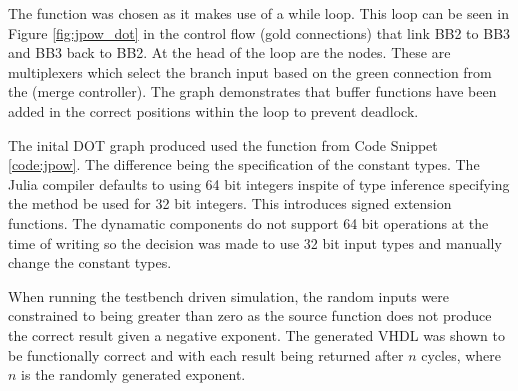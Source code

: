 The  function was chosen as it makes use of a while loop. This loop can be seen in Figure \ref{fig:jpow_dot} in the control flow (gold connections) that link BB2 to BB3 and BB3 back to BB2. At the head of the loop are the  nodes. These are multiplexers which select the branch input based on the green connection from the  (merge controller). The graph demonstrates that buffer functions have been added in the correct positions within the loop to prevent deadlock.

The inital DOT graph produced used the  function from Code Snippet \ref{code:jpow}. The difference being the specification of the constant types. The Julia compiler defaults to using 64 bit integers inspite of type inference specifying the method be used for 32 bit integers. This introduces signed extension functions. The dynamatic components do not support 64 bit operations at the time of writing so the decision was made to use 32 bit input types and manually change the constant types.

When running the testbench driven simulation, the random inputs were constrained to being greater than zero as the source function does not produce the correct result given a negative exponent. The generated VHDL was shown to be functionally correct and with each result being returned after $n$ cycles, where $n$ is the randomly generated exponent.

\pagebreak

